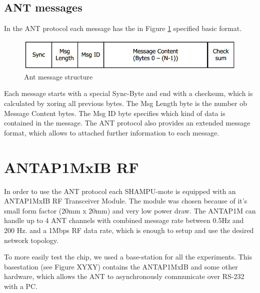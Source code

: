 \subsection{ANT messages}
In the ANT protocol each message has the in Figure \ref{fig:antmsg} specified basic format.
\begin{figure}[h]
	\centering
	\includegraphics[scale=.75]{./pics/ANTmsg.png}
	\caption{Ant message structure}\label{fig:antmsg}
\end{figure}
Each message starts with a special Sync-Byte and end with a checksum, which is calculated by xoring all previous bytes. The Msg Length byte is the number ob Message Content bytes. The Msg ID byte specifies which kind of data is contained in the message. The ANT protocol also provides an extended message format, which allows to attached further information to each message.


\section{ANTAP1MxIB RF}
In order to use the ANT protocol each SHAMPU-mote is equipped with an ANTAP1MxIB RF Transceiver Module. The module was chosen because of it's small form factor (20mm x 20mm) and very low power draw. The ANTAP1M can handle up to 4 ANT channels with combined message rate between 0.5Hz and 200 Hz. and a 1Mbps RF data rate, which is enough to setup and use the desired network topology.

To more easily test the chip, we used a base-station for all the experiments. This basestation (see Figure XYXY) contains the ANTAP1MxIB and some other hardware, which allows the ANT to asynchronously communicate over RS-232 with a PC. 

